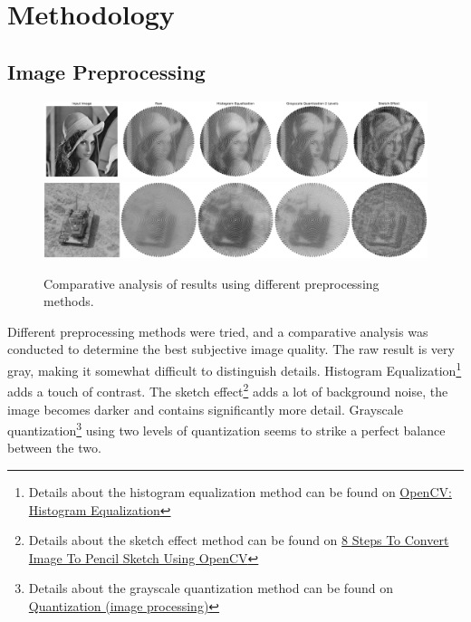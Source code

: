 \chapter{Methodology}

\section{Image Preprocessing}

\begin{figure}[H]
    \centering
    \includegraphics[width=\linewidth]{images/preprocess/preprocessed_results.pdf}
    \includegraphics[width=\linewidth]{images/preprocess/preprocessed_results_tank.pdf}
    \caption{Comparative analysis of results using different preprocessing methods.}
    \label{fig:preprocess_results}
\end{figure}

Different preprocessing methods were tried, and a comparative analysis was conducted to determine the best subjective image quality. The raw result is very gray, making it somewhat difficult to distinguish details. Histogram Equalization\footnote{Details about the histogram equalization method can be found on \href{https://docs.opencv.org/4.x/d4/d1b/tutorial_histogram_equalization.html}{OpenCV: Histogram Equalization}} adds a touch of contrast. The sketch effect\footnote{Details about the sketch effect method can be found on \href{https://medium.com/@Kavya2099/image-to-pencil-sketch-using-opencv-ec3568443c5e}{8 Steps To Convert Image To Pencil Sketch Using OpenCV}} adds a lot of background noise, the image becomes darker and contains significantly more detail. Grayscale quantization\footnote{Details about the grayscale quantization method can be found on \href{https://en.wikipedia.org/wiki/Quantization_(image_processing)\#Grayscale_quantization}{Quantization (image processing)}} using two levels of quantization seems to strike a perfect balance between the two.

